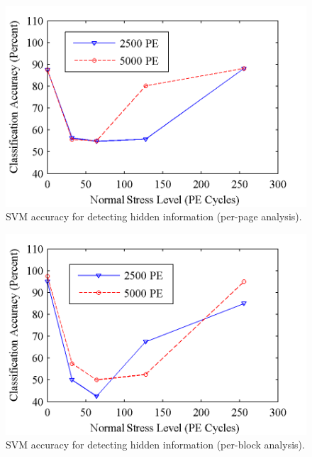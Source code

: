 \begin{figure} 
\begin{center} 
\includegraphics[width=\mywidth]{figs/per_page_svm.png} 
\caption{SVM accuracy for detecting hidden information (per-page analysis).}
\label{fig:page_svm} 
\vspace{-0.1in}

\end{center} 
\end{figure}


\begin{figure} 
\begin{center} 
\includegraphics[width=\mywidth]{figs/per_block_svm.png} 
\caption{SVM accuracy for detecting hidden information (per-block analysis).}
\label{fig:block_svm} 
\vspace{-0.1in}

\end{center} 
\end{figure}


